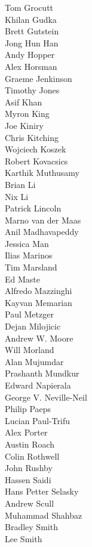 \begin{small}
\begin{autogrid}{4}
Tom Grocutt \\
Khilan Gudka \\
Brett Gutstein \\
Jong Hun Han \\
Andy Hopper \\
Alex Horsman \\
Graeme Jenkinson \\
Timothy Jones \\
Asif Khan \\
Myron King \\
Joe Kiniry \\
Chris Kitching \\
Wojciech Koszek \\
Robert Kovacsics \\
Karthik Muthusamy \\
Brian Li \\
Nix Li \\
Patrick Lincoln \\
Marno van der Maas \\
Anil Madhavapeddy \\
Jessica Man \\
Ilias Marinos \\
Tim Marsland \\
Ed Maste \\
Alfredo Mazzinghi \\
Kayvan Memarian \\
Paul Metzger \\
Dejan Milojicic \\
Andrew W. Moore \\
Will Morland \\
Alan Mujumdar \\
Prashanth Mundkur \\
Edward Napierala \\
George V. Neville-Neil \\
Philip Paeps \\
Lucian Paul-Trifu \\
Alex Porter \\
Austin Roach \\
Colin Rothwell \\
John Rushby \\
Hassen Saidi \\
Hans Petter Selasky \\
Andrew Scull \\
Muhammad Shahbaz \\
Bradley Smith \\
Lee Smith \\

\end{autogrid}
\end{small}

